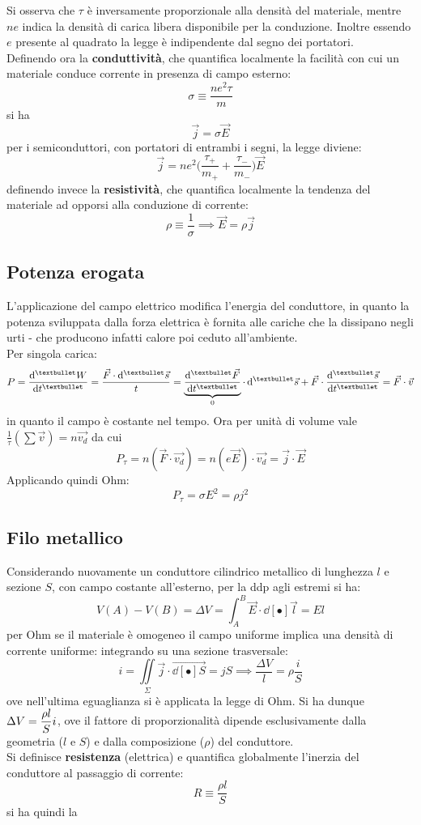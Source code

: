 
Si osserva che $\tau$ è inversamente proporzionale alla densità del materiale, mentre $n e$ indica la densità di carica libera disponibile per la conduzione. Inoltre essendo $e$ presente al quadrato la legge è indipendente dal segno dei portatori.
\\Definendo ora la \textbf{conduttività}, che quantifica localmente la facilità con cui un materiale conduce corrente in presenza di campo esterno:
\[\sigma \equiv \frac{n e^2 \tau}{m}\]
si ha
\[\vec{j} = \sigma \vec{E}\]
per i semiconduttori, con portatori di entrambi i segni, la legge diviene:
\[\vec{j} = ne^2 \big(\frac{\tau_{+}}{m_{+}} + \frac{\tau_{-}}{m_{-}}\big) \vec{E}\]
definendo invece la \textbf{resistività}, che quantifica localmente la tendenza del materiale ad opporsi alla conduzione di corrente:
\[\rho \equiv \frac{1}{\sigma} \implies \vec{E} = \rho \vec{j}\]

\subsection{Potenza erogata}
L'applicazione del campo elettrico modifica l'energia del conduttore, in quanto la potenza sviluppata dalla forza elettrica è fornita alle cariche che la dissipano negli urti - che producono infatti calore poi ceduto all'ambiente.
\\Per singola carica:
\[P = \dv[•]{W}{t} = \frac{\vec{F} \cdot \dd[•]{\vec{s}}}{t} = \underbrace{\dv[•]{\vec{F}}{t}}_{0} \cdot \dd[•]{\vec{s}} + \vec{F} \cdot \dv[•]{\vec{s}}{t} = \vec{F} \cdot \vec{v}\]
in quanto il campo è costante nel tempo. Ora per unità di volume vale $\frac{1}{\tau}(\sum \vec{v}) = n \vec{v_d}$ da cui
\[P_\tau = n (\vec{F} \cdot \vec{v_d}) = n (e \vec{E}) \cdot \vec{v_d} = \vec{j} \cdot \vec{E}\]
Applicando quindi Ohm:
\[P_\tau = \sigma E^2 = \rho j^2\]

\subsection{Filo metallico}
Considerando nuovamente un conduttore cilindrico metallico di lunghezza $l$ e sezione $S$, con campo costante all'esterno, per la ddp agli estremi si ha:
\[V(A) - V(B) = \Delta V = \int_A^B \vec{E} \cdot \dd[•]{\vec{l}} = E l\]
per Ohm se il materiale è omogeneo il campo uniforme implica una densità di corrente uniforme: integrando su una sezione trasversale:
\[i = \iint\limits_\Sigma \vec{j} \cdot \vec{\dd[•]{S}} = j S \implies \frac{\Delta V}{l} = \rho \frac{i}{S}\]
ove nell'ultima eguaglianza si è applicata la legge di Ohm. Si ha dunque $\displaystyle \Delta V = \frac{\rho l}{S} i$, ove il fattore di proporzionalità dipende esclusivamente dalla geometria ($l$ e $S$) e dalla composizione ($\rho$) del conduttore.
\\Si definisce \textbf{resistenza} (elettrica) e quantifica globalmente l'inerzia del conduttore al passaggio di corrente:
\[R \equiv \frac{\rho l}{S}\]
si ha quindi la

